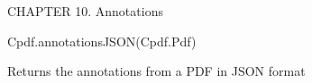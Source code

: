 CHAPTER 10. Annotations

Cpdf.annotationsJSON(Cpdf.Pdf)

Returns the annotations from a PDF in JSON format
